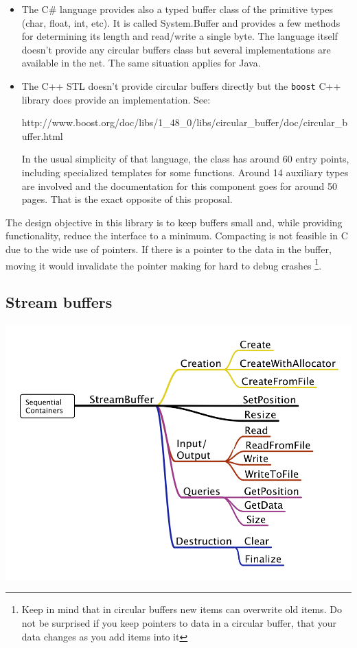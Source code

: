 \documentclass[12pt,a4paper]{memoir} %
\begin{document}
{{\begin{itemize}
\item The C\# language provides also a typed buffer class of the primitive types (char, float, int, etc). It is called System.Buffer and provides a few 
methods for determining its length and read/write a single byte. The language itself doesn't provide any circular buffers class but several 
implementations are available in the net. The same situation applies for Java.
\item The C++ STL doesn't provide circular buffers directly but the \texttt{boost} C++ library does provide an implementation. See:
\par
{\small
http://www.boost.org/doc/libs/1\_48\_0/libs/circular\_buffer/doc/circular\_buffer.html}
\par
In the usual simplicity of that language, the class has around 60 entry points, including specialized templates for some functions. Around 14 auxiliary 
types are involved and the documentation for this component goes for around 50 pages. That is the exact opposite of this proposal.
\end{itemize}
The design objective in this library is to keep buffers small and, while providing functionality, reduce the interface to a minimum. Compacting is not 
feasible in C due to the wide use of pointers. If there is a pointer to the data in the buffer, moving it would invalidate the pointer making for hard 
to debug crashes \footnote{Keep in mind that in circular buffers new items can overwrite old items. Do not be surprised if you keep pointers to data in 
a circular buffer, that your data changes as you add items into it}.

\subsection{Stream buffers}

\includegraphics[scale=0.44]{StreamBuffer.png}\hfill\par

}}
\end{document}
